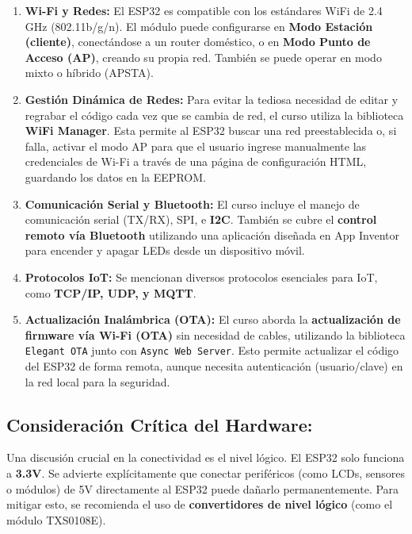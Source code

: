 \documentclass{article}
\begin{document}
\begin{enumerate}
    \item \textbf{Wi-Fi y Redes:} El ESP32 es compatible con los estándares WiFi de 2.4 GHz (802.11b/g/n). El módulo puede configurarse en \textbf{Modo Estación (cliente)}, conectándose a un router doméstico, o en \textbf{Modo Punto de Acceso (AP)}, creando su propia red. También se puede operar en modo mixto o híbrido (APSTA).

    \item \textbf{Gestión Dinámica de Redes:} Para evitar la tediosa necesidad de editar y regrabar el código cada vez que se cambia de red, el curso utiliza la biblioteca \textbf{WiFi Manager}. Esta permite al ESP32 buscar una red preestablecida o, si falla, activar el modo AP para que el usuario ingrese manualmente las credenciales de Wi-Fi a través de una página de configuración HTML, guardando los datos en la EEPROM.

    \item \textbf{Comunicación Serial y Bluetooth:} El curso incluye el manejo de comunicación serial (TX/RX), SPI, e \textbf{I2C}. También se cubre el \textbf{control remoto vía Bluetooth} utilizando una aplicación diseñada en App Inventor para encender y apagar LEDs desde un dispositivo móvil.

    \item \textbf{Protocolos IoT:} Se mencionan diversos protocolos esenciales para IoT, como \textbf{TCP/IP, UDP, y MQTT}.

    \item \textbf{Actualización Inalámbrica (OTA):} El curso aborda la \textbf{actualización de firmware vía Wi-Fi (OTA)} sin necesidad de cables, utilizando la biblioteca \texttt{Elegant OTA} junto con \texttt{Async Web Server}. Esto permite actualizar el código del ESP32 de forma remota, aunque necesita autenticación (usuario/clave) en la red local para la seguridad.
\end{enumerate}

\subsection*{Consideración Crítica del Hardware:}

Una discusión crucial en la conectividad es el nivel lógico. El ESP32 solo funciona a \textbf{3.3V}. Se advierte explícitamente que conectar periféricos (como LCDs, sensores o módulos) de 5V directamente al ESP32 puede dañarlo permanentemente. Para mitigar esto, se recomienda el uso de \textbf{convertidores de nivel lógico} (como el módulo TXS0108E).
\end{document}
